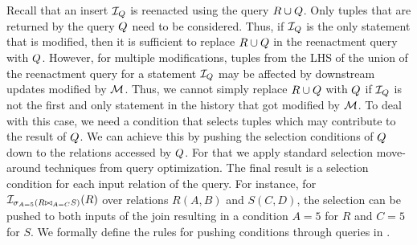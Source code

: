 Recall that an insert $\mathcal{I}_{Q}$ is reenacted using the query $R \cup Q$. Only tuples that are returned by the query $Q$ need to be considered. Thus, if $\mathcal{I}_{Q}$ is the only statement that is modified, then it is sufficient to replace $R \cup Q$ in the reenactment query with $Q$. However, for multiple modifications, tuples from the LHS of the union of the reenactment query for a statement $\mathcal{I}_{Q}$ may be affected by downstream updates modified by $\mathcal{M}$. Thus, we cannot simply replace $R \cup Q$ with $Q$ if $\mathcal{I}_{Q}$ is not the first and only statement in the history that got modified by $\mathcal{M}$. To deal with this case, we need a condition that selects tuples which may contribute to the result of $Q$. We can achieve this by pushing the selection conditions of $Q$ down to the relations accessed by $Q$. For that we apply standard selection move-around techniques from query optimization. The final result is a selection condition for each input relation of the query. For instance, for $\mathcal{I}_{\sigma_{A=5}(R \bowtie_{A=C} S)}(R)$ over relations $R(A,B)$ and $S(C,D)$, the selection can be pushed to both inputs of the join resulting in a condition $A=5$ for $R$ and $C=5$ for $S$.
We formally define the rules for pushing conditions through queries in \cite{techreport}.

